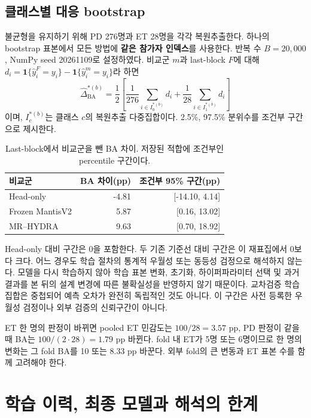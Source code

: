 \documentclass[11pt,a4paper]{article}
\newcommand{\ind}{\mathbf{1}}
\DeclareMathOperator{\BA}{BA}
\begin{document}
\subsection{클래스별 대응 bootstrap}
불균형을 유지하기 위해 PD 276명과 ET 28명을 각각 복원추출한다.
하나의 bootstrap 표본에서 모든 방법에 \textbf{같은 참가자 인덱스}를 사용한다.
반복 수 $B=20{,}000$, NumPy seed 20261109로 설정하였다.
비교군 $m$과 last-block $F$에 대해
$d_i=\ind\{\widehat y_i^{F}=y_i\}-\ind\{\widehat y_i^m=y_i\}$라 하면
\begin{equation}
 \widehat\Delta_{\BA}^{*(b)}=
 \frac12\left[\frac1{276}\sum_{i\in I_{0}^{*(b)}}d_i+
 \frac1{28}\sum_{i\in I_{1}^{*(b)}}d_i\right]
\end{equation}
이며, $I_c^{*(b)}$는 클래스 $c$의 복원추출 다중집합이다.
2.5\%, 97.5\% 분위수를 조건부 구간으로 제시한다.
\begin{table}[H]\centering\small
\caption{Last-block에서 비교군을 뺀 BA 차이. 저장된 적합에 조건부인 percentile 구간이다.}
\begin{tabular}{@{}lrr@{}}\toprule
비교군 & BA 차이(pp) & 조건부 95\% 구간(pp)\\\midrule
Head-only & -4.81 & [-14.10, 4.14] \\
Frozen MantisV2 & 5.87 & [0.16, 13.02] \\
MR--HYDRA & 9.63 & [0.70, 18.92] \\
\bottomrule\end{tabular}
\end{table}
Head-only 대비 구간은 0을 포함한다. 두 기존 기준선 대비 구간은 이 재표집에서 0보다 크다.
어느 경우도 학습 절차의 통계적 우월성 또는 동등성 검정으로 해석하지 않는다.
모델을 다시 학습하지 않아 학습 표본 변화, 초기화, 하이퍼파라미터 선택 및
과거 결과를 본 뒤의 설계 변경에 따른 불확실성을 반영하지 않기 때문이다.
교차검증 학습 집합은 중첩되어 예측 오차가 완전히 독립적인 것도 아니다.
이 구간은 사전 등록한 우월성 검정이나 외부 검증의 신뢰구간이 아니다.

ET 한 명의 판정이 바뀌면 pooled ET 민감도는 $100/28=3.57$ pp,
PD 판정이 같을 때 BA는 $100/(2\cdot28)=1.79$ pp 바뀐다.
fold 내 ET가 5명 또는 6명이므로 한 명의 변화는 그 fold BA를 10 또는 8.33 pp 바꾼다.
외부 fold의 큰 변동과 ET 표본 수를 함께 고려해야 한다.
\clearpage

\section{학습 이력, 최종 모델과 해석의 한계}
\end{document}
